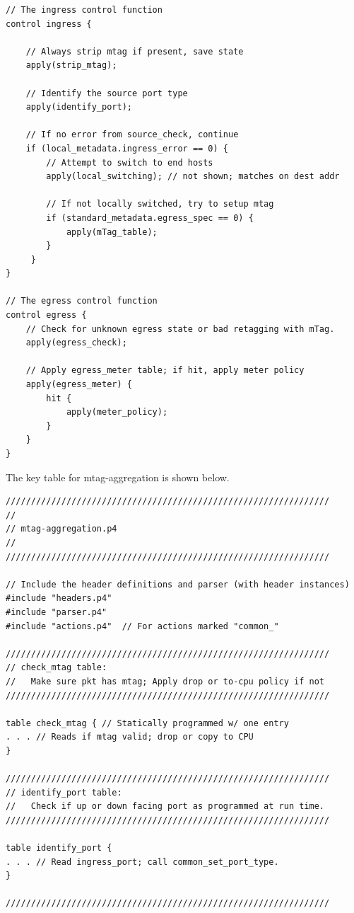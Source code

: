 \documentclass[12pt]{article}
\begin{document}
\begin{itemize}
\begin{lstlisting}[keywords={},frame=single,escapechar=\@]
// The ingress control function
control ingress {

    // Always strip mtag if present, save state
    apply(strip_mtag);

    // Identify the source port type
    apply(identify_port);

    // If no error from source_check, continue
    if (local_metadata.ingress_error == 0) {
        // Attempt to switch to end hosts
        apply(local_switching); // not shown; matches on dest addr

        // If not locally switched, try to setup mtag
        if (standard_metadata.egress_spec == 0) {
            apply(mTag_table);
        }
     }
}

// The egress control function
control egress {
    // Check for unknown egress state or bad retagging with mTag.
    apply(egress_check);

    // Apply egress_meter table; if hit, apply meter policy
    apply(egress_meter) {
        hit {
            apply(meter_policy);
        }
    }
}
\end{lstlisting}

The key table for mtag-aggregation is shown below.

\begin{lstlisting}[keywords={},frame=single,escapechar=\@]
////////////////////////////////////////////////////////////////
//
// mtag-aggregation.p4
//
////////////////////////////////////////////////////////////////

// Include the header definitions and parser (with header instances)
#include "headers.p4"
#include "parser.p4"
#include "actions.p4"  // For actions marked "common_"

////////////////////////////////////////////////////////////////
// check_mtag table:  
//   Make sure pkt has mtag; Apply drop or to-cpu policy if not
////////////////////////////////////////////////////////////////

table check_mtag { // Statically programmed w/ one entry
. . . // Reads if mtag valid; drop or copy to CPU
}

////////////////////////////////////////////////////////////////
// identify_port table:  
//   Check if up or down facing port as programmed at run time.
////////////////////////////////////////////////////////////////

table identify_port {
. . . // Read ingress_port; call common_set_port_type.
}

////////////////////////////////////////////////////////////////


\end{lstlisting}
\end{itemize}
\end{document}
